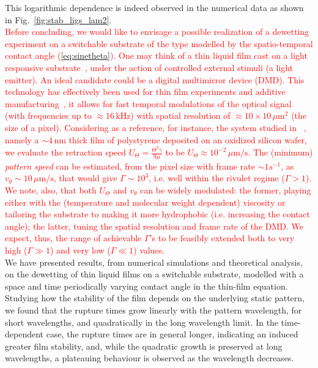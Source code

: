 \documentclass[twocolumn,amsmath,amssymb,showpacs,prl,superscriptaddress]{revtex4-1} %
\begin{document}
This logarithmic dependence is indeed observed in the numerical data as shown in Fig.~\ref{fig:stab_ligs_lam2}.\\
\textcolor{red}{Before concluding, we would like to envisage a possible realization of a 
dewetting experiment on a switchable substrate of the type modelled by the spatio-temporal 
contact angle (\ref{eq:sinetheta}). One may think of a thin liquid film cast on a light responsive substrate~\cite{IchimuraEtAl_Science2000}, under the action of controlled 
external stimuli (a light emitter). 
An ideal candidate could be a digital multimirror device (DMD).
This technology has effectively been used for thin film experiments and additive manufacturing~\cite{doi:10.1021/jp301092y, doi:10.1126/science.aax8760}, it allows for fast temporal modulations of the optical signal (with frequencies up to $\approx 16 \, \text{kHz}$)
with spatial resolution of $\approx 10 \times 10 \, \mu \text{m}^2$ (the size of a pixel).
Considering as a reference, for instance, the system studied in ~\cite{becker2003complex,PhysRevLett.99.114503}, namely a $\sim 4 \, \text{nm}$ thick film 
of polystyrene deposited on an oxidized silicon wafer,  
we evaluate the retraction speed 
$U_{\Theta} = \frac{\Theta^3 \gamma}{9 \mu}$ to be 
$U_{\Theta} \approx 10^{-2} \, \mu \text{m}/\text{s}$. 
The (minimum) {\it pattern speed} can be 
estimated, from the pixel size with frame rate $\sim 1 s^{-1}$, as 
$v_{\theta} \sim 10 \, \mu \text{m}/\text{s}$, that would give $\Gamma \sim 10^3$, i.e. well within the rivulet regime ($\Gamma > 1$). We note, also, that both $U_{\Theta}$ and $v_{\theta}$ can be widely modulated: the former, playing either with the (temperature and molecular weight dependent) viscosity 
or tailoring the substrate to making it more hydrophobic (i.e. increasing the contact angle); the latter, tuning
the spatial resolution and frame rate of the DMD. We expect, thus, the range of achievable $\Gamma$'s to 
be feasibly extended both to very high ($\Gamma \gg 1$) and very low ($\Gamma \ll 1$) values.}\\
We have presented results, from numerical simulations and theoretical analysis, on the dewetting of thin liquid films on a switchable substrate, modelled with a space and time periodically varying contact angle in the thin-film equation.
Studying how the stability of the film depends on the underlying static pattern, we found that the rupture times grow linearly with the pattern wavelength, for short wavelengths, and quadratically in the long wavelength limit. 
In the time-dependent case, the rupture times are in general longer, indicating an induced greater film stability, and, while the quadratic growth is preserved at long wavelengths, a plateauing behaviour is observed as the wavelength decreases. 
\end{document}
